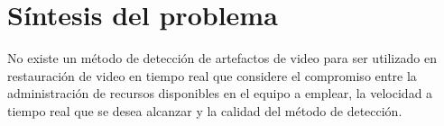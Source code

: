 
\chapter{Síntesis del problema}
\label{chp:sintesis}

No existe un método de detección de artefactos de video para ser utilizado en restauración de video en tiempo real que considere el compromiso entre la administración de recursos disponibles en el equipo a emplear, la velocidad a tiempo real que se desea alcanzar y la calidad del método de detección.
